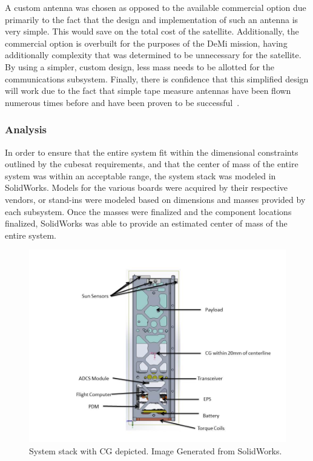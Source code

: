 \documentclass[12pt]{article}
\begin{document}
A custom antenna was chosen as opposed to the available commercial option due primarily to the fact that the design and implementation of such an antenna is very simple. This would save on the total cost of the satellite. Additionally, the commercial option is overbuilt for the purposes of the DeMi mission, having additionally complexity that was determined to be unnecessary for the satellite. By using a simpler, custom design, less mass needs to be allotted for the communications subsystem. Finally, there is confidence that this simplified design will work due to the fact that simple tape measure antennas have been flown numerous times before and have been proven to be successful~\cite{uhf-cubesat, cubesat-leo}.

\subsubsection{Analysis}

In order to ensure that the entire system fit within the dimensional constraints outlined by the cubesat requirements, and that the center of mass of the entire system was within an acceptable range, the system stack was modeled in SolidWorks. Models for the various boards were acquired by their respective vendors, or stand-ins were modeled based on dimensions and masses provided by each subsystem. Once the masses were finalized and the component locations finalized, SolidWorks was able to provide an estimated center of mass of the entire system.

\begin{figure}[!ht]
\centering
\includegraphics[width=5in]{images/STR-6-revised.jpg}
\caption{System stack with CG depicted. Image Generated from SolidWorks.}
\label{fig:str-6}
\end{figure}
\end{document}
